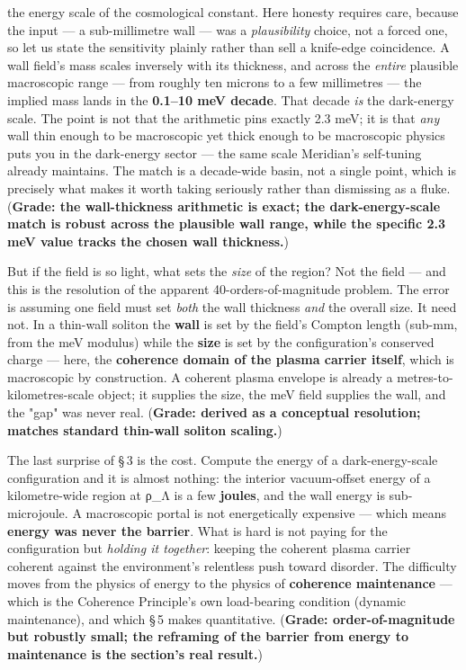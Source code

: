 \documentclass[11pt]{article}
\begin{document}
the energy scale of the cosmological constant. Here honesty requires care, because the input --- a sub-millimetre wall --- was a \emph{plausibility} choice, not a forced one, so let us state the sensitivity plainly rather than sell a knife-edge coincidence. A wall field's mass scales inversely with its thickness, and across the \emph{entire} plausible macroscopic range --- from roughly ten microns to a few millimetres --- the implied mass lands in the \textbf{0.1--10 meV decade}. That decade \emph{is} the dark-energy scale. The point is not that the arithmetic pins exactly 2.3 meV; it is that \emph{any} wall thin enough to be macroscopic yet thick enough to be macroscopic physics puts you in the dark-energy sector --- the same scale Meridian's self-tuning already maintains. The match is a decade-wide basin, not a single point, which is precisely what makes it worth taking seriously rather than dismissing as a fluke. (\textbf{Grade: the wall-thickness arithmetic is exact; the dark-energy-scale match is robust across the plausible wall range, while the specific 2.3 meV value tracks the chosen wall thickness.})

But if the field is so light, what sets the \emph{size} of the region? Not the field --- and this is the resolution of the apparent 40-orders-of-magnitude problem. The error is assuming one field must set \emph{both} the wall thickness \emph{and} the overall size. It need not. In a thin-wall soliton the \textbf{wall} is set by the field's Compton length (sub-mm, from the meV modulus) while the \textbf{size} is set by the configuration's conserved charge --- here, the \textbf{coherence domain of the plasma carrier itself}, which is macroscopic by construction. A coherent plasma envelope is already a metres-to-kilometres-scale object; it supplies the size, the meV field supplies the wall, and the "gap" was never real. (\textbf{Grade: derived as a conceptual resolution; matches standard thin-wall soliton scaling.})

The last surprise of \S\,3 is the cost. Compute the energy of a dark-energy-scale configuration and it is almost nothing: the interior vacuum-offset energy of a kilometre-wide region at ρ\_Λ is a few \textbf{joules}, and the wall energy is sub-microjoule. A macroscopic portal is not energetically expensive --- which means \textbf{energy was never the barrier}. What is hard is not paying for the configuration but \emph{holding it together}: keeping the coherent plasma carrier coherent against the environment's relentless push toward disorder. The difficulty moves from the physics of energy to the physics of \textbf{coherence maintenance} --- which is the Coherence Principle's own load-bearing condition (dynamic maintenance), and which \S\,5 makes quantitative. (\textbf{Grade: order-of-magnitude but robustly small; the reframing of the barrier from energy to maintenance is the section's real result.})
\end{document}
